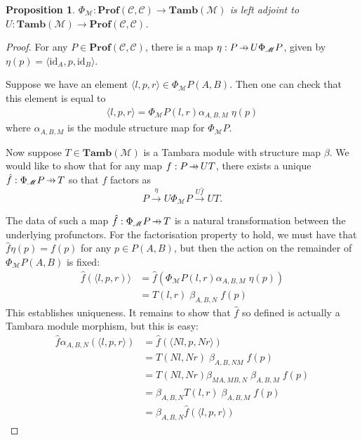 \documentclass[11pt,a4paper]{article}
\theoremstyle{plain}
\newtheorem{proposition}[theorem]{Proposition}
\theoremstyle{definition}
\newcommand{\C}{\mathscr{C}}
\newcommand{\M}{\mathscr{M}}
\newcommand{\Pastro}{\Phi}
\newcommand{\Prof}{\mathbf{Prof}}
\newcommand{\Tamb}{\mathbf{Tamb}}
\newcommand{\id}{\mathrm{id}}
\newcommand{\hto}{\ensuremath{\,\mathaccent\shortmid\rightarrow\,}}
\begin{document}
\begin{proposition}
  $\Pastro_\M : \Prof(\C, \C) \to \Tamb(\M)$ is left adjoint to $U : \Tamb(\M) \to \Prof(\C, \C)$.
\end{proposition}
\begin{proof}
  For any $P \in \Prof(\C, \C)$, there is a map $\eta : P \hto U \Phi_\M P$, given by $\eta(p) = \langle \id_A, p, \id_B \rangle$.

  Suppose we have an element $\langle l, p, r \rangle \in \Pastro_\M P(A,B)$. Then one can check that this element is equal to
  \begin{align*}
    \langle l, p, r \rangle = \Pastro_\M P(l, r) \alpha_{A, B, M} \; \eta(p)
  \end{align*}
  where $\alpha_{A, B, M}$ is the module structure map for $\Pastro_\M P$.

  Now suppose $T \in \Tamb(\M)$ is a Tambara module with structure map $\beta$. We would like to show that for any map $f : P \hto UT$, there exists a unique $\hat f : \Phi_\M P \hto T$ so that $f$ factors as \[P \xrightarrow{\eta} U \Phi_\M P \xrightarrow{U\hat f} UT. \]

  The data of such a map $\hat f : \Phi_\M P \hto T$ is a natural transformation between the underlying profunctors. For the factorisation property to hold, we must have that $\hat{f}\eta(p) = f(p)$ for any $p \in P(A,B)$, but then the action on the remainder of $\Phi_\M P(A, B)$ is fixed:
  \begin{align*}
    \hat{f}(\langle l, p, r) \rangle &= \hat{f}(\Pastro_\M P(l, r) \alpha_{A, B, M} \; \eta(p)) \\
                                     &=T(l, r) \; \beta_{A, B, N} \; f(p)
  \end{align*}
  This establishes uniqueness. It remains to show that $\hat{f}$ so defined is actually a Tambara module morphism, but this is easy:
  \begin{align*}
    \hat{f}\alpha_{A,B,N}(\langle l, p, r \rangle)
    &= \hat{f}(\langle Nl, p, Nr \rangle) \\
    &= T(Nl, Nr) \; \beta_{A, B, NM} \; f(p) \\
    &= T(Nl, Nr) \beta_{MA,MB,N} \; \beta_{A, B, M} \; f(p) \\
    &= \beta_{A,B,N} T(l, r) \; \beta_{A, B, M} \; f(p) \\
    &= \beta_{A,B,N} \hat{f} (\langle l, p, r \rangle)
  \end{align*}
\end{proof}
\end{document}
